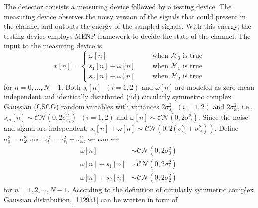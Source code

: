 The detector consists a measuring device followed by a testing device. 
The measuring device observes the noisy version of the signals that could present in the channel and outputs the energy of the sampled signals.
With this energy, the testing device employs MENP framework to decide the state of the channel.
The input to the measuring device is 
\begin{equation}
  x[n] = 
  \begin{cases}
	\omega[n]\;\;\;\;\;\;&\text{when $\mathcal{H}_0$ is true}\\
	s_1[n]+\omega[n]\;\;\;\;\;\;&\text{when $\mathcal{H}_1$ is true}\\
	s_2[n]+\omega[n]\;\;\;\;\;\;&\text{when $\mathcal{H}_2$ is true}
  \end{cases}
\end{equation}
for $n = 0, \ldots, N-1$.
Both $s_i[n]\;\;(i=1, 2)$ and $\omega[n]$ are modeled as zero-mean independent and identically distributed (iid) circularly symmetric complex Gaussian (CSCG) random variables with variances $2\sigma_{s_i}^2\;\;(i=1, 2)$ and $2\sigma_{\omega}^2$, i.e., $s_m[n] \sim \mathcal{CN}(0, 2\sigma_{s_i}^2)\;\;(i=1, 2)$ and $\omega[n] \sim \mathcal{CN}(0, 2\sigma_{\omega}^2)$. 
Since the noise and signal are independent, $s_i[n]+\omega[n] \sim \mathcal{CN}(0, 2(\sigma_{s_i}^2 + \sigma_\omega^2))$.  Define $\sigma_0^2 = \sigma_\omega^2$ and $\sigma_i^2 = \sigma_{s_i}^2 + \sigma_\omega^2$, we can see
\begin{equation}
  \label{1129a1}
  \begin{split}
  \omega[n] &\sim \mathcal{CN}(0, 2\sigma_0^2)\\
  \omega[n] + s_1[n]&\sim \mathcal{CN}(0, 2\sigma_1^2)\\
  \omega[n] + s_2[n]&\sim \mathcal{CN}(0, 2\sigma_2^2) \,
  \end{split}
\end{equation}
for $n = 1, 2, \cdots, N-1$. According to the definition of circularly symmetric complex Gaussian distribution, \eqref{1129a1} can be written in form of 
